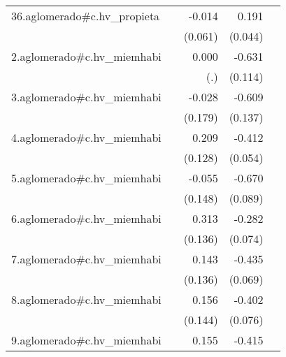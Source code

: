 {\begin{longtable}{l*{4}{D{.}{.}{-1}}}
\addlinespace
36.aglomerado#c.hv\_propieta&                     &      -0.014         &       0.191\sym{***}&                     \\
            &                     &     (0.061)         &     (0.044)         &                     \\
\addlinespace
2.aglomerado#c.hv\_miemhabi&                     &       0.000         &      -0.631\sym{***}&                     \\
            &                     &         (.)         &     (0.114)         &                     \\
\addlinespace
3.aglomerado#c.hv\_miemhabi&                     &      -0.028         &      -0.609\sym{***}&                     \\
            &                     &     (0.179)         &     (0.137)         &                     \\
\addlinespace
4.aglomerado#c.hv\_miemhabi&                     &       0.209         &      -0.412\sym{***}&                     \\
            &                     &     (0.128)         &     (0.054)         &                     \\
\addlinespace
5.aglomerado#c.hv\_miemhabi&                     &      -0.055         &      -0.670\sym{***}&                     \\
            &                     &     (0.148)         &     (0.089)         &                     \\
\addlinespace
6.aglomerado#c.hv\_miemhabi&                     &       0.313\sym{*}  &      -0.282\sym{***}&                     \\
            &                     &     (0.136)         &     (0.074)         &                     \\
\addlinespace
7.aglomerado#c.hv\_miemhabi&                     &       0.143         &      -0.435\sym{***}&                     \\
            &                     &     (0.136)         &     (0.069)         &                     \\
\addlinespace
8.aglomerado#c.hv\_miemhabi&                     &       0.156         &      -0.402\sym{***}&                     \\
            &                     &     (0.144)         &     (0.076)         &                     \\
\addlinespace
9.aglomerado#c.hv\_miemhabi&                     &       0.155         &      -0.415\sym{***}&                     \\

\end{longtable}}
